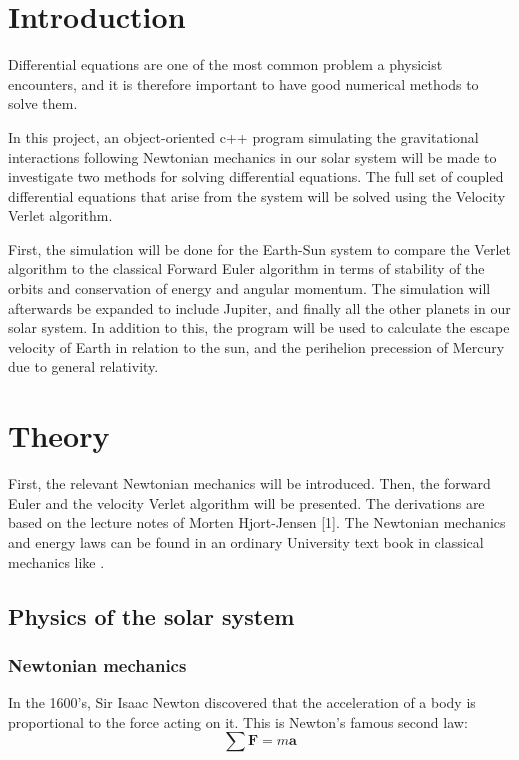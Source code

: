 \documentclass[10pt,a4paper,titlepage]{article}
\begin{document}
\section{Introduction}
Differential equations are one of the most common problem a physicist encounters, and it is therefore important to have good numerical methods to solve them. 
	
In this project, an object-oriented c++ program simulating the gravitational interactions following Newtonian mechanics in our solar system will be made to investigate two methods for solving differential equations. The full set of coupled differential equations that arise from the system will be solved using the Velocity Verlet algorithm. 

First, the simulation will be done for the Earth-Sun system to compare the Verlet algorithm to the classical Forward Euler algorithm in terms of stability of the orbits and conservation of energy and angular momentum. The simulation will afterwards be expanded to include Jupiter, and finally all the other planets in our solar system. In addition to this, the program will be used to calculate the escape velocity of Earth in relation to the sun, and the perihelion precession of Mercury due to general relativity. 


\section{Theory}
First, the relevant Newtonian mechanics will be introduced. Then, the forward Euler and the velocity Verlet algorithm will be presented. The derivations are based on the lecture notes of Morten Hjort-Jensen [1]. The Newtonian mechanics and energy laws can be found in an ordinary University text book in classical mechanics like \cite{physics}. 
\subsection{Physics of the solar system} 
\subsubsection{Newtonian mechanics}
In the 1600's, Sir Isaac Newton discovered that the acceleration of a body is proportional to the force acting on it. This is Newton's famous second law:
\begin{equation}
\label{eq:newt_2}
\sum\mathbf{F} = m\mathbf{a}
\end{equation}
\end{document}
